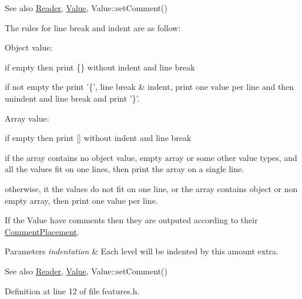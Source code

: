 \begin{DoxySeeAlso}{See also}
\hyperlink{protocol_json_1_1_j_s_o_n___a_p_i_a8d5594b46204fb65661a8c96c015ea54}{Reader}, \hyperlink{protocol_json_1_1_j_s_o_n___a_p_i_a3a85c4423131080eb9300546d6130dfd}{Value}, Value\-::set\-Comment()
\end{DoxySeeAlso}
The rules for line break and indent are as follow\-:
\begin{DoxyItemize}
\item Object value\-:
\begin{DoxyItemize}
\item if empty then print \{\} without indent and line break
\item if not empty the print '\{', line break \& indent, print one value per line and then unindent and line break and print '\}'.
\end{DoxyItemize}
\item Array value\-:
\begin{DoxyItemize}
\item if empty then print \mbox{[}\mbox{]} without indent and line break
\item if the array contains no object value, empty array or some other value types, and all the values fit on one lines, then print the array on a single line.
\item otherwise, it the values do not fit on one line, or the array contains object or non empty array, then print one value per line.
\end{DoxyItemize}
\end{DoxyItemize}

If the Value have comments then they are outputed according to their \hyperlink{namespace_json_a4fc417c23905b2ae9e2c47d197a45351}{Comment\-Placement}.


\begin{DoxyParams}{Parameters}
{\em indentation} & Each level will be indented by this amount extra. \\
\hline
\end{DoxyParams}
\begin{DoxySeeAlso}{See also}
\hyperlink{protocol_json_1_1_j_s_o_n___a_p_i_a8d5594b46204fb65661a8c96c015ea54}{Reader}, \hyperlink{protocol_json_1_1_j_s_o_n___a_p_i_a3a85c4423131080eb9300546d6130dfd}{Value}, Value\-::set\-Comment() 
\end{DoxySeeAlso}


Definition at line 12 of file features.\-h.



